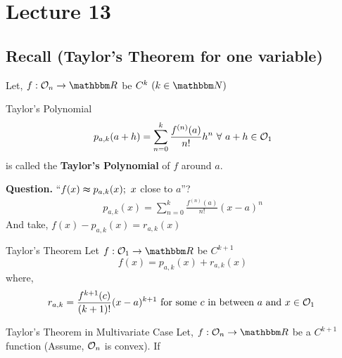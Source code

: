 \documentclass[Analysis-3]{subfiles}
\begin{document}
\chapter*{Lecture 13} %
\setcounter{chapter}{13} %
\setcounter{section}{0}

\section{Recall (Taylor's Theorem for one variable)}

Let, $ f : \Op{n} \to \R $ be $C^k \ (k \in \N)$

\begin{Def}{Taylor's Polynomial}{}
    \[ p_{a,k}(a+h) = \sum_{n = 0}^{k} \frac{f^{(n)}(a)}{n!} h^{n} \ \forall\ a+h \in \mathcal{O}_{1} \]
    is called the \textbf{Taylor's Polynomial} of $f$ around $a$.
\end{Def}

\textbf{Question.} ``$f(x) \thickapprox  p_{a,k}(x);\ x$ close to $a$''?
\begin{align*}
    p_{a,k}(x) = \sum_{n = 0}^{k} \frac{f^{(n)}(a)}{n!} (x-a)^{n}
\end{align*}
And take, $f(x) - p_{a,k}(x) = r_{a,k}(x)$

\begin{Thm}{Taylor's Theorem}{}
    Let $ f: \Op{1} \to \R $ be $C^{k+1}$
    \[ f(x) = p_{a,k}(x) + r_{a,k}(x) \]
    where, \[r_{a,k} = \frac{f^{k+1}(c)}{(k+1)!} (x-a)^{k+1} \ \text{for some $c$ in between $a$ and $x \in \mathcal{O}_{1}$ }\]
\end{Thm}

\begin{Thm}{Taylor's Theorem in Multivariate Case}{}
    Let, $ f: \Op{n} \to \R $ be a $C^{k+1}$ function (Assume, $\mathcal{O}_{n}$ is convex). If
\end{Thm}
\end{document}

